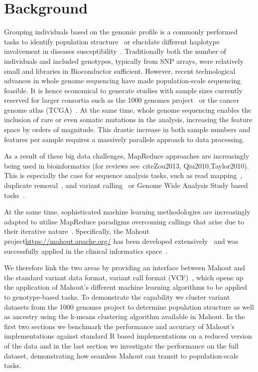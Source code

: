 \documentclass[twocolumn]{bmcart}%
\begin{document}
\section*{Background}
Grouping individuals based on the genomic profile is a commonly performed tasks to identify population structure~\cite{Gao2007} or elucidate different haplotype involvement in diseases susceptibility~\cite{Laitman2013}.  Traditionally both the number of individuals and included genotypes, typically from SNP arrays, were relatively small and libraries in Bioconductor sufficient. However, recent technological advances in whole genome sequencing have made population-scale sequencing feasible. It is hence economical to generate studies with sample sizes currently reserved for larger consortia such as the 1000 genomes project~\cite{1KG2012} or the cancer genome atlas (TCGA)~\cite{TCGA2013}. At the same time, whole genome sequencing enables the inclusion of rare or even somatic mutations in the analysis, increasing the feature space by orders of magnitude. This drastic increase in both sample numbers and features per sample requires a massively parallele approach to data processing. 

As a result of these big data challenges, MapReduce approaches are increasingly being used in bioinformatics (for reviews see~cite{Zou2013, Qiu2010,Taylor2010}). This is especially the case for sequence analysis tasks, such as read mapping~\cite{Schatz2009}, duplicate removal~\cite{Jourdren2012}, and variant calling~\cite{Langmead2009, McKenna2010} or Genome Wide Analysis Study based tasks~\cite{Huang2013, Guo2014}.

At the same time, sophisticated machine learning methodologies are increasingly adapted to utilise MapReduce paradigms overcoming callings that arise due to their iterative nature~\cite{Chu2009}. Specifically, the Mahout project\url{https://mahout.apache.org/} has been developed extensively~\cite{Ranger2007, Owen2011} and was successfully applied in the clinical informatics space~\cite{Dong2013}.

We therefore link the two areas by providing an interface between Mahout and the standard variant data format, variant call format (VCF)~\cite{1KG2012}, which opens up the application of Mahout's different machine learning algorithms to be applied to genotype-based tasks.   
To demonstrate the capability we cluster variant datasets from the 1000 genomes project to determine population structure as well as ancestry using the k-means clustering algorithm available in Mahout. In the first two sections we benchmark the performance and accuracy of Mahout's implementations against standard R based implementations on a reduced version of the data and in the last section we investigate the performance on the full dataset, demonstrating how seamless Mahout can transit to population-scale tasks.   
\end{document}
